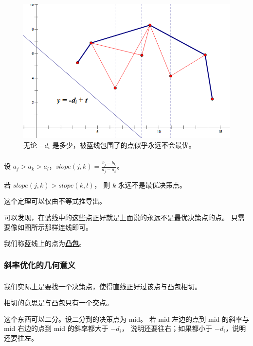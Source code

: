 \documentclass[9pt, UTF8]{beamer} %
\newcommand \fts {\frametitle{\insertsubsection}}
\newcommand \ftss {\frametitle{\insertsubsubsection}}
\newcommand \bpause { \bigskip \pause }
\begin{document}
	\begin{frame}
		\fts

		\begin{figure}
			\centering
			\includegraphics[scale=0.35]{pic/pic8.png}
			\caption{无论 $-d_i$ 是多少，被蓝线包围了的点似乎永远不会最优。}
		\end{figure}
	\end{frame}

	\begin{frame}
		\fts

		\begin{theorem}
			设 $a_j > a_k > a_l$，$slope(j, k) = \frac {b_j - b_k} {a_j - a_k}$。

			若 $slope(j, k) > slope(k, l)$，
			则 $k$ 永远不是最优决策点。

			这个定理可以仅由不等式推导出。
		\end{theorem}

		可以发现，在蓝线中的这些点正好就是上面说的永远不是最优决策点的点。
		只需要像如图所示那样连线即可。

		\bpause

		我们称蓝线上的点为\textbf{\uline{凸包}}。
	\end{frame}

	\subsubsection{斜率优化的几何意义}

	\begin{frame}
		\ftss

		我们实际上是要找一个决策点，使得直线正好过该点与凸包相切。

		相切的意思是与凸包只有一个交点。

		\bpause

		这个东西可以二分。设二分到的决策点为 mid。
		若 mid 左边的点到 mid 的斜率与 mid 右边的点到 mid 的斜率都大于 $-d_i$，
		说明还要往右；如果都小于 $-d_i$，说明还要往左。
	\end{frame}
\end{document}
